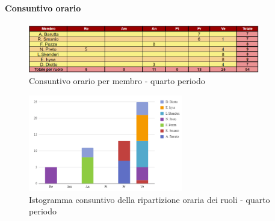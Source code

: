 \paragraph*{Consuntivo orario } \hspace{1pt}

\begin{figure}[H]
    \centering
    \includegraphics[width=0.9\textwidth]{../Images/consuntivoOrario4Periodo.png}
    \caption{Consuntivo orario per membro - quarto periodo}
    \label{fig:Constuntivo_orario_4}
\end{figure}

\begin{figure}[H]
    \centering
    \includegraphics[width=0.6\textwidth]{../Images/consuntivoDivisioneRuoli4Periodo.png}
    \caption{Istogramma consuntivo della ripartizione oraria dei ruoli - quarto periodo}
    \label{fig:Consuntivo_ripartizione_oraria_4}
\end{figure}
